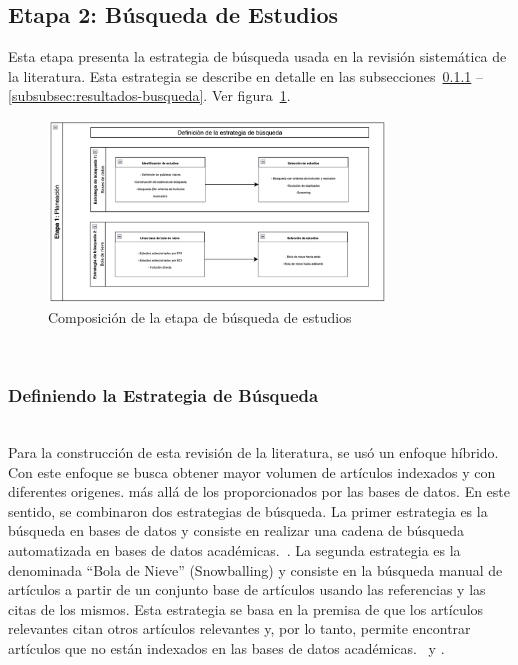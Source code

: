\subsection{Etapa 2: Búsqueda de Estudios}
Esta etapa presenta la estrategia de búsqueda usada en la revisión sistemática de la literatura. Esta estrategia se describe en detalle en las subsecciones~\ref{subsubsec:Definiendo la Estrategia de Busqueda} -- \ref{subsubsec:resultados-busqueda}. Ver figura~\ref{fig:etapa2}.

\begin{figure}[tbp]
    \centering
    \includegraphics[width=0.8\textwidth]{resources/images/planeacion/estrategias-busqueda.png}
    \caption{Composición de la etapa de búsqueda de estudios}\label{fig:etapa2}
\end{figure}
\mbox{}\\

\subsubsection{Definiendo la Estrategia de Búsqueda}\label{subsubsec:Definiendo la Estrategia de Busqueda}
\mbox{}\\
Para la construcción de esta revisión de la literatura, se usó un enfoque híbrido. Con este enfoque se busca obtener mayor volumen de artículos indexados y con diferentes origenes. más allá de los proporcionados por las bases de datos.
En este sentido, se combinaron dos estrategias de búsqueda. La primer estrategia es la búsqueda en bases de datos y consiste en realizar una cadena de búsqueda automatizada en bases de datos académicas.~\cite{jalali2012systematic}.
La segunda estrategia es la denominada ``Bola de Nieve'' (Snowballing) y consiste en la búsqueda manual de artículos a partir de un conjunto base de artículos usando las referencias y las citas de los mismos. Esta estrategia se basa en la premisa de que los artículos relevantes citan otros artículos relevantes y, por lo tanto, permite encontrar artículos que no están indexados en las bases de datos académicas.~\cite{jalali2012systematic} y \cite{goodman1961snowball}.
\mbox{}\\

